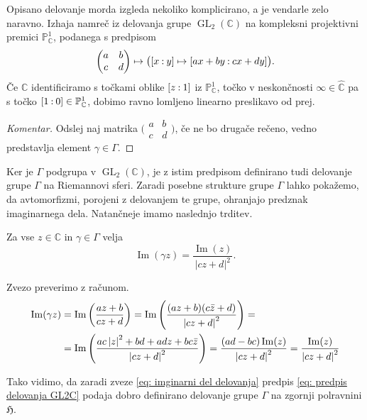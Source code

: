 \documentclass[mat1]{fmfdelo}
\numberwithin{equation}{section}
\newcommand{\C}{\mathbb C}
\newcommand{\HH}{\mathfrak{H}}
\newcommand{\PP}{\mathbb P}
\newcommand{\RS}{\widehat{\C}}
\newcommand{\SL}{\Gamma}
\newcommand{\abcd}{\big(\begin{smallmatrix} a & b\\c & d \end{smallmatrix}\big)}
\newcommand{\pabcd}{\begin{pmatrix} a & b \\ c & d \end{pmatrix}}
\newcommand{\pcoor}[1]{%
\begingroup\lccode`~=`: \lowercase{\endgroup
\edef~}{\mathbin{\mathchar\the\mathcode`:}\nobreak}%
\left[%
\begingroup
\mathcode`:=\string"8000
#1%
\endgroup
\right]%
}
\newcommand{\abs}[1]{\left\lvert #1 \right\rvert}
\renewcommand\Im{\operatorname{Im}}%
\DeclareMathOperator{\GL}{GL}
\theoremstyle{definition}
\newenvironment{komentar}[1][Komentar]{\begin{proof}[#1]\let\qed\relax}{\end{proof}}
\begin{document}
\begin{opomba}
    Opisano delovanje morda izgleda nekoliko komplicirano, a je vendarle zelo naravno. Izhaja namreč iz delovanja grupe $\GL_2(\C)$ na kompleksni projektivni premici $\PP^1_\C$, podanega s predpisom
    \[
        \pabcd \mapsto \bigl(\pcoor{x : y} \mapsto \pcoor{ax + by : cx + dy}\bigr).  
    \]
    Če $\C$ identificiramo s točkami oblike $\pcoor{z : 1}$ iz $\PP^1_\C$, točko v neskončnosti $\infty \in \RS$ pa s točko $\pcoor{1 : 0} \in \PP^1_\C$, dobimo ravno lomljeno linearno preslikavo od prej. 
\end{opomba}

\begin{komentar}
    Odslej naj matrika $\abcd$, če ne bo drugače rečeno, vedno predstavlja element $\gamma \in \SL$.
\end{komentar}
Ker je $\SL$ podgrupa v $\GL_2(\C)$, je z istim predpisom definirano tudi delovanje grupe $\SL$ na Riemannovi sferi. Zaradi posebne strukture grupe $\SL$ lahko pokažemo, da avtomorfizmi, porojeni z delovanjem te grupe, ohranjajo predznak imaginarnega dela. Natančneje imamo naslednjo trditev.

\begin{trditev}
    Za vse $z \in \C$ in $\gamma \in \SL$ velja 
    \begin{equation}
        \label{eq: imginarni del delovanja}
        \Im(\gamma z) = \frac{\Im(z)}{\abs{cz + d}^2}.
    \end{equation} 
\end{trditev} 

\begin{dokaz}
Zvezo preverimo z računom.
\begin{align*}
    \Im(\gamma z) &= 
    \Im\left(\frac{az + b}{cz + d}\right) = 
    \Im\left(\frac{(az + b)(c\bar{z} + d)}{\abs{cz + d}^2}\right) = \\
    &= \Im\left(\frac{ac\abs{z}^2 + bd + adz + bc\bar{z}}{\abs{cz + d}^2}\right) = 
    \frac{(ad - bc)\Im(z)}{\abs{cz + d}^2} = \frac{\Im(z)}{\abs{cz + d}^2} \qedhere
\end{align*}
\end{dokaz}
\begin{opomba}
    Tako vidimo, da zaradi zveze \eqref{eq: imginarni del delovanja} predpis \eqref{eq: predpis delovanja GL2C} podaja dobro definirano delovanje grupe $\SL$ na zgornji polravnini $\HH$.
\end{opomba}
\end{document}
